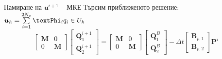 \documentclass{beamer}
\newcommand{\vecf}[1]{\boldsymbol{#1}}
\begin{document}
\begin{frame}{Намиране на $\textbf{u}^{i+1}$ -- МКЕ}
	Търсим приближеното решение: $\vecf{u}_h = \sum\limits_{i=1}^{2N_v}{\vecf{\textPhi}_iq_i} \in U_h$
	$$
	\begin{bmatrix}
		\mathbf{M} & 0 \\
		0 & \mathbf{M}
	\end{bmatrix} \begin{bmatrix}
		\vecf{Q}^{i+1}_1 \\
		\vecf{Q}^{i+1}_2
	\end{bmatrix} =	\begin{bmatrix}
		\mathbf{M} & 0 \\
		0 & \mathbf{M}
	\end{bmatrix} \begin{bmatrix}
		\vecf{Q}^{B}_1 \\
		\vecf{Q}^{B}_2
	\end{bmatrix} - \Delta t \begin{bmatrix}
		\vecf{B}_{p,1} \\
		\vecf{B}_{p,2}
	\end{bmatrix} \vecf{P}^i
	$$
\end{frame}
\iffalse
\end{document}
